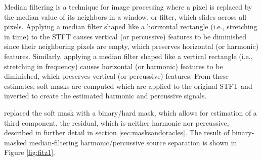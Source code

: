\documentclass[report.tex]{subfiles}
\begin{document}
Median filtering is a technique for image processing where a pixel is replaced by the median value of its neighbors in a window, or filter, which slides across all pixels. Applying a median filter shaped like a horizontal rectangle (i.e., stretching in time) to the STFT causes vertical (or percussive) features to be diminished since their neighboring pixels are empty, which preserves horizontal (or harmonic) features. Similarly, applying a median filter shaped like a vertical rectangle (i.e., stretching in frequency) causes horizontal (or harmonic) features to be diminished, which preserves vertical (or percussive) features. From these estimates, soft masks are computed which are applied to the original STFT and inverted to create the estimated harmonic and percussive signals.
 
\textcite{driedger} replaced the soft mask with a binary/hard mask, which allows for estimation of a third component, the residual, which is neither harmonic nor percussive, described in further detail in section \ref{sec:masksandoracles}. The result of binary-masked median-filtering harmonic/percussive source separation is shown in Figure \ref{fig:fitz1}.
\end{document}
